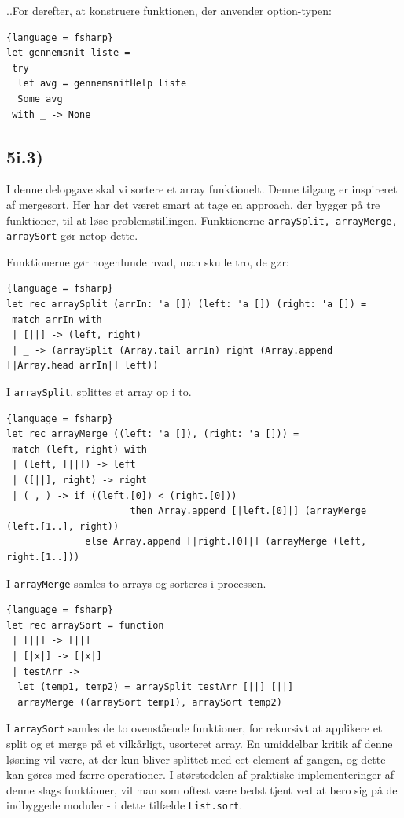 \documentclass[a4paper,10pt]{article}
\begin{document}
..For derefter, at konstruere funktionen, der anvender option-typen: 
\begin{lstlisting}{language = fsharp}
let gennemsnit liste = 
 try 
  let avg = gennemsnitHelp liste
  Some avg
 with _ -> None
\end{lstlisting}

\subsection{5i.3)}
I denne delopgave skal vi sortere et array funktionelt. Denne tilgang er inspireret af mergesort. Her har det været smart at tage en approach, der bygger på tre funktioner, til at løse problemstillingen. Funktionerne \texttt{arraySplit, arrayMerge, arraySort} gør netop dette. 

Funktionerne gør nogenlunde hvad, man skulle tro, de gør: 
\begin{lstlisting}{language = fsharp}
let rec arraySplit (arrIn: 'a []) (left: 'a []) (right: 'a []) = 
 match arrIn with
 | [||] -> (left, right)
 | _ -> (arraySplit (Array.tail arrIn) right (Array.append [|Array.head arrIn|] left)) 
\end{lstlisting}

I \texttt{arraySplit}, splittes et array op i to.

\begin{lstlisting}{language = fsharp}
let rec arrayMerge ((left: 'a []), (right: 'a [])) =
 match (left, right) with 
 | (left, [||]) -> left
 | ([||], right) -> right
 | (_,_) -> if ((left.[0]) < (right.[0])) 
                      then Array.append [|left.[0]|] (arrayMerge (left.[1..], right)) 
              else Array.append [|right.[0]|] (arrayMerge (left, right.[1..]))

\end{lstlisting}
I \texttt{arrayMerge} samles to arrays og sorteres i processen.  

\begin{lstlisting}{language = fsharp}
let rec arraySort = function
 | [||] -> [||]
 | [|x|] -> [|x|]
 | testArr -> 
  let (temp1, temp2) = arraySplit testArr [||] [||]
  arrayMerge ((arraySort temp1), arraySort temp2)
\end{lstlisting}
I \texttt{arraySort} samles de to ovenstående funktioner, for rekursivt at applikere et split og et merge på et vilkårligt, usorteret array. En umiddelbar kritik af denne løsning vil være, at der kun bliver splittet med eet element af gangen, og dette kan gøres med færre operationer. I størstedelen af praktiske implementeringer af denne slags funktioner, vil man som oftest være bedst tjent ved at bero sig på de indbyggede moduler - i dette tilfælde \texttt{List.sort}. 
\end{document}
